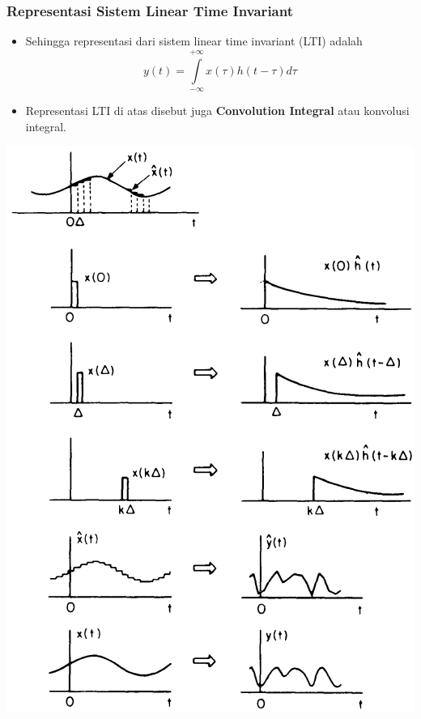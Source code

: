 \documentclass[pdflatex,compress,mathserif]{beamer}
\begin{document}
\begin{frame}
	\frametitle{Representasi Sistem Linear Time Invariant}
	\begin{itemize}
		\item Sehingga representasi dari sistem linear time invariant (LTI) adalah
		\begin{equation*}
		y(t) = \int\limits_{-\infty}^{+\infty} x(\tau)h(t-\tau)d\tau
		\end{equation*}
		\item Representasi LTI di atas disebut juga \textbf{Convolution Integral} atau konvolusi integral.
	\end{itemize}
\end{frame}

\begin{frame}
	\begin{center}
		\includegraphics[height=0.8\textheight]{img/img05}
	\end{center}
\end{frame}
\end{document}
